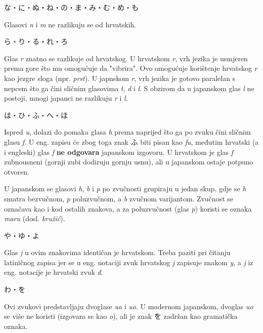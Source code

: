 	\vspace{5pt}
	\noindent\ten な・に・ぬ・ね・の・ま・み・む・め・も
	
	Glasovi \textit{n} i \textit{m} ne razlikuju se od hrvatskih.
	
	\vspace{5pt}
	\noindent\ten ら・り・る・れ・ろ
	
	Glas \textit{r} znatno se razlikuje od hrvatskog. U hrvatskom \textit{r}, vrh jezika je usmjeren prema gore što mu omogućuje da "vibrira". Ovo omogućuje korištenje hrvatskog \textit{r} kao jezgre sloga (npr. \textit{prst}). U japnskom \textit{r}, vrh jezika je gotovo paralelan s nepcem što ga čini sličnim glasovima \textit{t}, \textit{d} i \textit{l}. S obzirom da u japanskom glas \textit{l} ne postoji, mnogi japanci ne razlikuju \textit{r} i \textit{l}.
	
	\vspace{5pt}
	\noindent\ten は・ひ・ふ・へ・ほ
	
	Ispred \textit{u}, dolazi do pomaka glasa \textit{h} prema naprijed što ga po zvuku čini sličnim glasu \textit{f}. U eng. zapisu će zbog toga znak ふ biti pisan kao \textit{fu}, međutim hrvatski (a i engleski) glas \textit{f} \textbf{ne odgovara} japanskom izgovoru. U hrvatskom je glas \textit{f} zubnousneni (gornji zubi dodiruju gornju usnu), ali u japanskom ostaje potpuno otvoren.
	
	U japanskom se glasovi \textit{h}, \textit{b} i \textit{p} po zvučnosti grupiraju u jedan skup, gdje se \textit{h} smatra bezvučnom, \textit{p} poluzvučnom\footnotemark[1], a \textit{b} zvučnom varijantom. Zvučnost se označava kao i kod ostalih znakova, a za poluzvučnost (glas \textit{p}) koristi se oznaka \textit{maru} (dosl. \textit{kružić}).
	
	
	\vspace{5pt}
	\noindent\ten や・ゆ・よ
	
	Glas \textit{j} u ovim znakovima identičan je hrvatskom. Treba paziti pri čitanju latiničnog zapisa jer se u eng. notaciji zvuk hrvatskog \textit{j} zapisuje znakom \textit{y}, a \textit{j} iz eng. notacije je hrvatski zvuk \textit{đ}.
	
	\vspace{5pt}
	\noindent\ten わ・を
	
	Ovi zvukovi predstavljaju dvoglase \textit{ua} i \textit{uo}. U modernom japanskom, dvoglas \textit{uo} se više ne koristi (izgovara se kao \textit{o}), ali je znak を zadržan kao gramatička oznaka.
	
